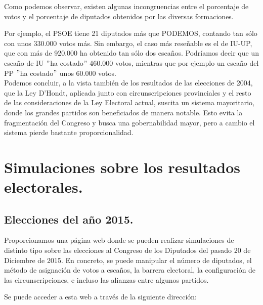 \documentclass[11pt]{article}
\begin{document}
	
	
		\enlargethispage{2\baselineskip}
	Como podemos observar, existen algunas incongruencias entre el porcentaje de votos y el porcentaje de diputados obtenidos por las diversas formaciones.
	
	Por ejemplo, el PSOE tiene 21 diputados más que PODEMOS, contando tan sólo con unos 330.000 votos más. Sin embargo, el caso más reseñable es el de IU-UP, que con más de 920.000 ha obtenido tan sólo dos escaños. Podríamos decir que un escaño de IU $"$ha costado$"$  460.000 votos, mientras que por ejemplo un escaño del PP $"$ha costado$"$ unos 60.000 votos.\\
	
	Podemos concluir, a la vista también de los resultados de las elecciones de 2004, que la Ley D'Hondt, aplicada junto con circunscripciones provinciales y el resto de las consideraciones de la Ley Electoral actual, suscita un sistema mayoritario, donde los grandes partidos son beneficiados de manera notable. Esto evita la fragmentación del Congreso y busca una gobernabilidad mayor, pero a cambio el sistema pierde bastante proporcionalidad.
	
	
	
	
	\section{Simulaciones sobre los resultados electorales.}
	\subsection{Elecciones del año 2015.}
	
	Proporcionamos una página web donde se pueden realizar simulaciones de distinto tipo sobre las elecciones al Congreso de los Diputados del pasado 20 de Diciembre de 2015. En concreto, se puede manipular el número de diputados, el método de asignación de votos a escaños, la barrera electoral, la configuración de las circunscripciones, e incluso las alianzas entre algunos partidos.
	
	Se puede acceder a esta web a través de la siguiente dirección:\\
	
\end{document}
